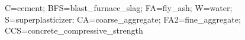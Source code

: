 C=cement; BFS=blast\_furnace\_slag; FA=fly\_ash; W=water; S=superplasticizer; CA=coarse\_aggregate; FA2=fine\_aggregate; CCS=concrete\_compressive\_strength